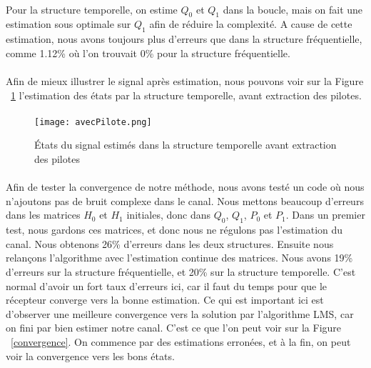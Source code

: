 \paragraph{}
Pour la structure temporelle, on estime $Q_0$ et $Q_1$ dans la boucle, mais on
fait une estimation sous optimale sur $Q_1$ afin de réduire la complexité. A
cause de cette estimation, nous avons toujours plus d'erreurs que dans la
structure fréquentielle, comme 1.12\% où l'on trouvait 0\% pour la structure
fréquentielle.
\paragraph{}
Afin de mieux illustrer le signal après estimation, nous pouvons voir sur la
Figure ~\ref{avecPilote} l'estimation des états par la structure temporelle,
avant extraction des pilotes.
\paragraph{}
\paragraph{}
\vspace{1\baselineskip}
\begin{figure}[!h]
  \centering
  \texttt{[image: avecPilote.png]}
  \caption{États du signal estimés dans la structure temporelle avant extraction des pilotes }
	\label{avecPilote}
\end{figure}
\vspace{1\baselineskip}
\paragraph{}
Afin de tester la convergence de notre méthode, nous avons testé un code où nous
n'ajoutons pas de bruit complexe dans le canal. Nous mettons beaucoup d'erreurs
dans les matrices $H_0$ et $H_1$ initiales, donc dans $Q_0$, $Q_1$, $P_0$ et
$P_1$. Dans un premier test, nous gardons ces matrices, et donc nous ne régulons
pas l'estimation du canal. Nous obtenons 26\% d'erreurs dans les deux
structures. Ensuite nous relançons l'algorithme avec l'estimation continue des
matrices. Nous avons 19\% d'erreurs sur la structure fréquentielle, et 20\% sur
la structure temporelle. C'est normal d'avoir un fort taux d'erreurs ici, car il
faut du temps pour que le récepteur converge vers la bonne estimation. Ce qui est
important ici est d'observer une  meilleure convergence vers
la solution par l'algorithme LMS, car on fini par bien estimer notre
canal. C'est ce que l'on peut voir sur la Figure ~\ref{convergence}. On commence
par des estimations erronées, et à la fin, on peut voir la convergence vers les
bons états.
